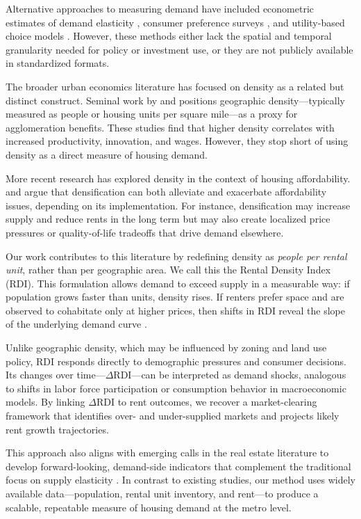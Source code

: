 \documentclass[sn-mathphys-num]{sn-jnl}%
\begin{document}
Alternative approaches to measuring demand have included econometric estimates of demand elasticity \citep{green2002measuring}, consumer preference surveys \citep{malpezzi1996rent}, and utility-based choice models \citep{rosenthal1997housing}. However, these methods either lack the spatial and temporal granularity needed for policy or investment use, or they are not publicly available in standardized formats.

The broader urban economics literature has focused on density as a related but distinct construct. Seminal work by \citet{glaeser2001cities} and \citet{duranton2004micro} positions geographic density---typically measured as people or housing units per square mile---as a proxy for agglomeration benefits. These studies find that higher density correlates with increased productivity, innovation, and wages. However, they stop short of using density as a direct measure of housing demand.

More recent research has explored density in the context of housing affordability. \citet{ahlfeldt2019economic} and \citet{albouy2015driving} argue that densification can both alleviate and exacerbate affordability issues, depending on its implementation. For instance, densification may increase supply and reduce rents in the long term but may also create localized price pressures or quality-of-life tradeoffs that drive demand elsewhere.

Our work contributes to this literature by redefining density as \textit{people per rental unit}, rather than per geographic area. We call this the Rental Density Index (RDI). This formulation allows demand to exceed supply in a measurable way: if population grows faster than units, density rises. If renters prefer space and are observed to cohabitate only at higher prices, then shifts in RDI reveal the slope of the underlying demand curve \citep{muth1969cities, molloy2022housing}.

Unlike geographic density, which may be influenced by zoning and land use policy, RDI responds directly to demographic pressures and consumer decisions. Its changes over time---\( \Delta \text{RDI} \)---can be interpreted as demand shocks, analogous to shifts in labor force participation or consumption behavior in macroeconomic models. By linking \( \Delta \text{RDI} \) to rent outcomes, we recover a market-clearing framework that identifies over- and under-supplied markets and projects likely rent growth trajectories.

This approach also aligns with emerging calls in the real estate literature to develop forward-looking, demand-side indicators that complement the traditional focus on supply elasticity \citep{glaeser2019rethinking}. In contrast to existing studies, our method uses widely available data---population, rental unit inventory, and rent---to produce a scalable, repeatable measure of housing demand at the metro level.
\end{document}
